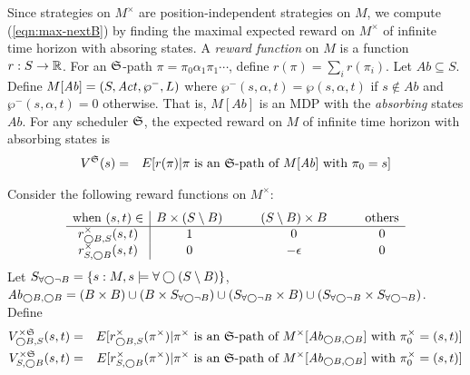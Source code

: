 
Since strategies on $M^{\times}$ are position-independent strategies
on $M$, we compute (\ref{eqn:max-nextB}) by finding the maximal
expected reward on $M^{\times}$ of infinite time horizon with absoring
states. A \emph{reward function} on $M$ is a function $r : S
\rightarrow \mathbb{R}$. For an $\mathfrak{S}$-path $\pi = \pi_0 \alpha_1 \pi_1
\cdots$, define $r (\pi) = \sum_i r (\pi_i)$.
Let $\mathit{Ab} \subseteq S$. Define $M[\mathit{Ab}] = (S, \mathit{Act},
\wp^-, L)$ where $\wp^- (s, \alpha, t) = \wp (s, \alpha, t)$ if $s
\not\in \mathit{Ab}$ and $\wp^- (s, \alpha, t) = 0$ otherwise. That
is, $M[\mathit{Ab}]$ is an MDP with the \emph{absorbing} states
$\mathit{Ab}$.
For any scheduler $\mathfrak{S}$, the expected reward on $M$ of
infinite time horizon with absorbing states is
\begin{eqnarray*}
{V}^{\mathfrak{S}} (s) & = &
E[ {r} (\pi) | \pi
\textmd{ is an $\mathfrak{S}$-path of } M[\mathit{Ab}]
\textmd{ with } \pi_0 = s ]
\end{eqnarray*}

Consider the following reward functions on $M^{\times}$:
\[
\begin{array}{c|ccccc}
  \textmd{when } (s, t) \in
  & B \times (S \setminus B)
  & \hspace{1em}
  & (S \setminus B) \times B
  & \hspace{1em}
  & \textmd{others}\\
  \hline
  {r}_{\bigcirc B, S}^{\times} (s, t) & 1 && 0 && 0\\
  {r}_{S, \bigcirc B}^{\times} (s, t) & 0 && -\epsilon && 0\\
\end{array}
\]
Let $S_{\forall \bigcirc \neg B} = \{ s : M, s \models \forall \bigcirc (S \setminus
B) \}$, $\mathit{Ab}_{\bigcirc B, \bigcirc B} = (B
\times B) \cup (B \times S_{\forall \bigcirc \neg B}) \cup (S_{\forall \bigcirc \neg B} \times B)
\cup (S_{\forall \bigcirc \neg B} \times S_{\forall \bigcirc \neg B})$.
Define
\begin{eqnarray*}
  {V}_{\bigcirc B, S}^{\times \mathfrak{S}} (s, t) & = &
  E[ {r}_{\bigcirc B, S}^{\times} (\pi^{\times}) | \pi^{\times} \textmd{ is an
  $\mathfrak{S}$-path of } M^{\times}[\mathit{Ab}_{\bigcirc B, \bigcirc B}]
  \textmd{ with } \pi_0^{\times} = (s, t) ]\\
  {V}_{S, \bigcirc B}^{\times \mathfrak{S}} (s, t) & = &
  E[ {r}_{S, \bigcirc B}^{\times} (\pi^{\times}) | \pi^{\times} \textmd{ is an
  $\mathfrak{S}$-path of } M^{\times}[\mathit{Ab}_{\bigcirc B, \bigcirc B}]
  \textmd{ with } \pi_0^{\times} = (s, t) ]
\end{eqnarray*}


